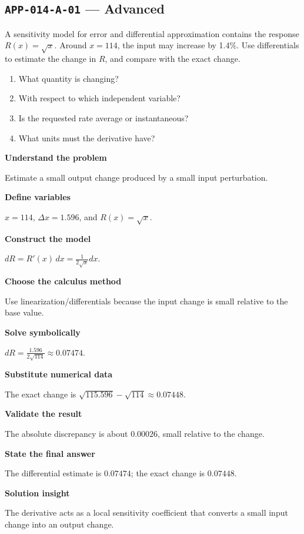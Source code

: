 \documentclass[11pt]{book}
\newcommand{\pid}[1]{\texttt{#1}}
\begin{document}
\subsection*{\pid{APP-014-A-01} — Advanced}
\begin{problembox}
A sensitivity model for error and differential approximation contains the response $R(x)=\sqrt{x}$. Around $x=114$, the input may increase by 1.4\%. Use differentials to estimate the change in $R$, and compare with the exact change.
\end{problembox}
\begin{promptbox}\begin{enumerate}
\item What quantity is changing?
\item With respect to which independent variable?
\item Is the requested rate average or instantaneous?
\item What units must the derivative have?
\end{enumerate}\end{promptbox}
\begin{solutionbox}
\textbf{Understand the problem}\par Estimate a small output change produced by a small input perturbation.\par\medskip
\textbf{Define variables}\par $x=114$, $\Delta x=1.596$, and $R(x)=\sqrt x$.\par\medskip
\textbf{Construct the model}\par $dR=R'(x)\,dx=\frac{1}{2\sqrt{x}}dx$.\par\medskip
\textbf{Choose the calculus method}\par Use linearization/differentials because the input change is small relative to the base value.\par\medskip
\textbf{Solve symbolically}\par $dR=\frac{1.596}{2\sqrt{114}}\approx 0.07474$.\par\medskip
\textbf{Substitute numerical data}\par The exact change is $\sqrt{115.596}-\sqrt{114}\approx 0.07448$.\par\medskip
\textbf{Validate the result}\par The absolute discrepancy is about $0.00026$, small relative to the change.\par\medskip
\textbf{State the final answer}\par The differential estimate is $0.07474$; the exact change is $0.07448$.\par\medskip
\textbf{Solution insight}\par The derivative acts as a local sensitivity coefficient that converts a small input change into an output change.\par\medskip
\end{solutionbox}
\end{document}
